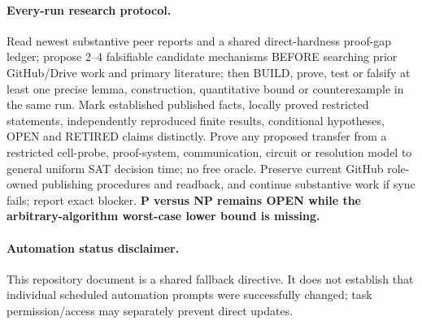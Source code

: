 \documentclass[11pt]{article}
\begin{document}
\paragraph{Every-run research protocol.}
Read newest substantive peer reports and a shared direct-hardness proof-gap ledger; propose 2--4 falsifiable candidate mechanisms BEFORE searching prior GitHub/Drive work and primary literature; then BUILD, prove, test or falsify at least one precise lemma, construction, quantitative bound or counterexample in the same run. Mark established published facts, locally proved restricted statements, independently reproduced finite results, conditional hypotheses, OPEN and RETIRED claims distinctly. Prove any proposed transfer from a restricted cell-probe, proof-system, communication, circuit or resolution model to general uniform SAT decision time; no free oracle. Preserve current GitHub role-owned publishing procedures and readback, and continue substantive work if sync fails; report exact blocker. \textbf{P versus NP remains OPEN while the arbitrary-algorithm worst-case lower bound is missing.}

\paragraph{Automation status disclaimer.}
This repository document is a shared fallback directive. It does not establish that individual scheduled automation prompts were successfully changed; task permission/access may separately prevent direct updates.
\end{document}
